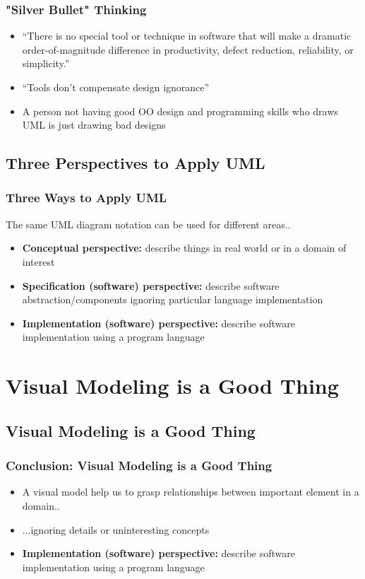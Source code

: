 \documentclass{beamer}
\begin{document}
\begin{frame}
	\frametitle{"Silver Bullet" Thinking}
	\begin{itemize}
    \item<+-> ``There is no special tool or technique in software that will make a dramatic order-of-magnitude difference in productivity, defect reduction, reliability, or simplicity.''
    \item<+->  ``Tools don't compensate design ignorance''
    \item<+-> A person not having good OO design and programming skills who draws UML is just drawing bad designs
    \end{itemize}
\end{frame}

\subsection{Three Perspectives to Apply UML}
\begin{frame}
	\frametitle{Three Ways to Apply UML}
	The same UML diagram notation can be used for different areas..
	\begin{itemize}
		\item<+-> \textbf{Conceptual perspective:} describe things in real world or in a domain of interest 
		\item<+-> \textbf{Specification (software) perspective:} describe software abstraction/components ignoring particular language implementation
		\item<+-> \textbf{Implementation (software) perspective:} describe software implementation using a program language
    \end{itemize}
\end{frame}

\section{Visual Modeling is a Good Thing}
\subsection{Visual Modeling is a Good Thing}
\begin{frame}
	\frametitle{Conclusion: Visual Modeling is a Good Thing}
	\begin{itemize}
		\item<+-> A visual model help us to grasp relationships between important element in a domain..
		\item<+-> ...ignoring details or uninteresting concepts 
		\item<+-> \textbf{Implementation (software) perspective:} describe software implementation using a program language
    \end{itemize}
\end{frame}
\end{document}
